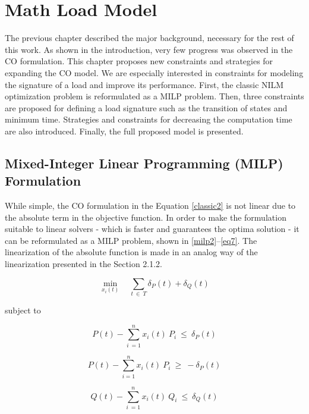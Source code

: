 
\chapter{Math Load Model}

The previous chapter described the major background, necessary for the rest of this work. As shown in the introduction, very few progress was observed in the CO formulation. This chapter proposes new constraints and strategies for expanding the CO model. We are especially interested in constraints for modeling the signature of a load and improve its performance. First, the classic NILM optimization problem is reformulated as a MILP problem. Then, three constraints are proposed for defining a load signature such as the transition of states and minimum time. Strategies and constraints for decreasing the computation time are also introduced. Finally, the full proposed model is presented. 

\section{Mixed-Integer Linear Programming (MILP) Formulation}

While simple, the CO formulation in the Equation \eqref{classic2} is not linear due to the absolute term in the objective function. In order to make the formulation suitable to linear solvers - which is faster and guarantees the optima solution - it can be reformulated as a MILP problem, shown in \eqref{milp2}--\eqref{eq7}. The linearization of the absolute function is made in an analog way of the linearization presented in the Section 2.1.2.

\begin{equation} \label{milp2}
    \min_{x_i(t)} \quad \sum_{t\ \in\ T} \delta_P(t) + \delta_Q(t)
\end{equation}

subject to 

\begin{equation} \label{eq65}
    P(t) - \sum_{i\ = 1}^{n} x_i(t)\ P_i \ \leq \ \delta_P(t) 
\end{equation}

\begin{equation} 
  P(t) - \sum_{i = 1}^{n} x_i(t)\ P_i \ \geq \ -\delta_P(t)
\end{equation}

\begin{equation} 
   Q(t) - \sum_{i\ = 1}^{n} x_i(t)\ Q_i \ \leq \ \delta_Q(t)
\end{equation}

